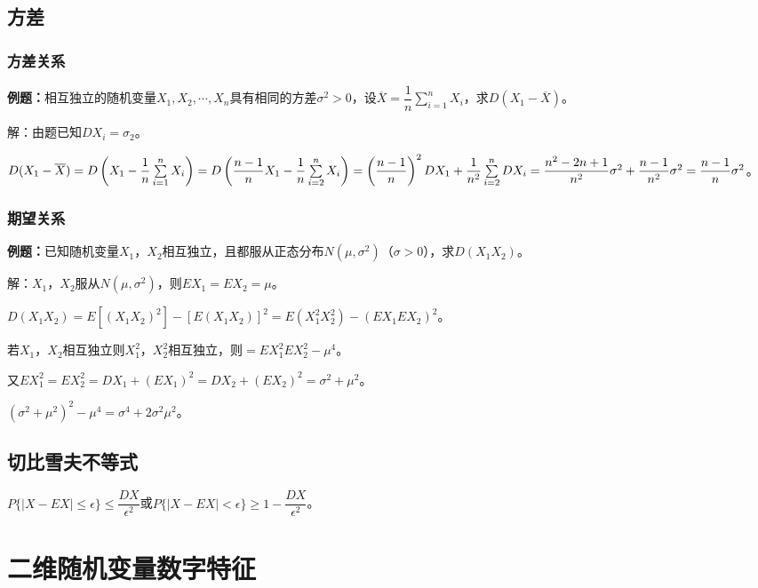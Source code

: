 \subsection{方差}

\subsubsection{方差关系}

\textbf{例题：}相互独立的随机变量$X_1,X_2,\cdots,X_n$具有相同的方差$\sigma^2>0$，设$\overline{X}=\dfrac{1}{n}\sum\limits_{i=1}^nX_i$，求$D(X_1-\overline{X})$。

解：由题已知$DX_i=\sigma_2$。

$D(X_1-\overline{X})=D\left(X_1-\dfrac{1}{n}\sum\limits_{i=1}^nX_i\right)=D\left(\dfrac{n-1}{n}X_1-\dfrac{1}{n}\sum\limits_{i=2}^nX_i\right)=\left(\dfrac{n-1}{n}\right)^2\\DX_1+\dfrac{1}{n^2}\sum\limits_{i=2}^nDX_i=\dfrac{n^2-2n+1}{n^2}\sigma^2+\dfrac{n-1}{n^2}\sigma^2=\dfrac{n-1}{n}\sigma^2$。

\subsubsection{期望关系}

\textbf{例题：}已知随机变量$X_1$，$X_2$相互独立，且都服从正态分布$N(\mu,\sigma^2)$（$\sigma>0$），求$D(X_1X_2)$。

解：$X_1$，$X_2$服从$N(\mu,\sigma^2)$，则$EX_1=EX_2=\mu$。

$D(X_1X_2)=E[(X_1X_2)^2]-[E(X_1X_2)]^2=E(X_1^2X_2^2)-(EX_1EX_2)^2$。

若$X_1$，$X_2$相互独立则$X_1^2$，$X_2^2$相互独立，则$=EX_1^2EX_2^2-\mu^4$。

又$EX_1^2=EX_2^2=DX_1+(EX_1)^2=DX_2+(EX_2)^2=\sigma^2+\mu^2$。

$(\sigma^2+\mu^2)^2-\mu^4=\sigma^4+2\sigma^2\mu^2$。

\subsection{切比雪夫不等式}

$P\{\vert X-EX\vert\leqslant\epsilon\}\leqslant\dfrac{DX}{\epsilon^2}$或$P\{\vert X-EX\vert<\epsilon\}\geqslant1-\dfrac{DX}{\epsilon^2}$。

\section{二维随机变量数字特征}

